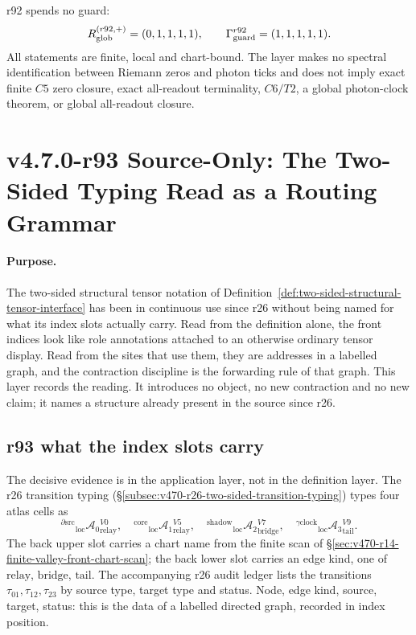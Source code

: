 r92 spends no guard:
\[
R_{\rm glob}^{(r92,+)}=(0,1,1,1,1),
\qquad
\Gamma_{\rm guard}^{r92}=(1,1,1,1,1).
\]
All statements are finite, local and chart-bound.  The layer makes no spectral identification
between Riemann zeros and photon ticks and does not imply exact finite \(C5\) zero closure,
exact all-readout terminality, \(C6/T2\), a global photon-clock theorem, or global
all-readout closure.


\clearpage
\section*{v4.7.0-r93 Source-Only: The Two-Sided Typing Read as a Routing Grammar}
\label{sec:r93-routing-reading}

\paragraph{Purpose.}
The two-sided structural tensor notation of
Definition~\ref{def:two-sided-structural-tensor-interface} has been in continuous use since
r26 without being named for what its index slots actually carry.  Read from the definition
alone, the front indices look like role annotations attached to an otherwise ordinary tensor
display.  Read from the sites that use them, they are addresses in a labelled graph, and the
contraction discipline is the forwarding rule of that graph.  This layer records the reading.
It introduces no object, no new contraction and no new claim; it names a structure already
present in the source since r26.

\subsection*{r93 what the index slots carry}
\label{subsec:r93-slot-content}

The decisive evidence is in the application layer, not in the definition layer.  The r26
transition typing (\S\ref{subsec:v470-r26-two-sided-transition-typing}) types four atlas
cells as
\[
{}^{\partial\mathrm{src}}{}_{\mathrm{loc}}\mathcal A_0{}^{V0}_{\mathrm{relay}},
\quad
{}^{\mathrm{core}}{}_{\mathrm{loc}}\mathcal A_1{}^{V5}_{\mathrm{relay}},
\quad
{}^{\mathrm{shadow}}{}_{\mathrm{loc}}\mathcal A_2{}^{V7}_{\mathrm{bridge}},
\quad
{}^{\gamma\mathrm{clock}}{}_{\mathrm{loc}}\mathcal A_3{}^{V9}_{\mathrm{tail}} .
\]
The back upper slot carries a chart name from the finite scan of
\S\ref{sec:v470-r14-finite-valley-front-chart-scan}; the back lower slot carries an edge
kind, one of \(\mathrm{relay}\), \(\mathrm{bridge}\), \(\mathrm{tail}\).  The accompanying
r26 audit ledger lists the transitions \(\tau_{01},\tau_{12},\tau_{23}\) by source type,
target type and status.  Node, edge kind, source, target, status: this is the data of a
labelled directed graph, recorded in index position.

